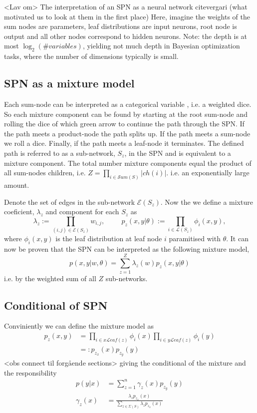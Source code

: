 \begin{note2}
     <Lav om> The interpretation of an SPN as a neural network cite{vergari} (what motivated us to look at them in the first place)
    Here, imagine the weights of the sum nodes are parameters, leaf distributions are input neurons, root node is output and
    all other nodes correspond to hidden neurons.
    Note: the depth is at most $\log_2(\# variables)$, yielding not much depth in Bayesian optimization tasks, where the number
    of dimensions typically is small. 
\end{note2}

\subsection{SPN as a mixture model}
Each sum-node can be interpreted as a categorical variable \cite{??}, i.e. a weighted dice. So each mixture
component can be found by starting at the root sum-node and rolling the dice of which green arrow to
continue the path through the SPN. If the path meets a product-node the path splits up. If the path
meets a sum-node we roll a dice. Finally, if the path meets a leaf-node it terminates. The defined
path is referred to as a sub-network, $S_z$, in the SPN and is equivalent to a mixture component. The total number
mixture components equal the
product of all sum-nodes children, i.e. $Z = \prod_{i\in \mathcal{S}um(S)}|ch(i)|$. 
i.e. an exponentially large amount. 

Denote the set of edges in the sub-network $\mathcal{E}(S_z)$.
Now the we define a mixture coeficient, $\lambda_z$ and component for each $S_z$ as 
$$\lambda_z := \prod_{(i,j)\in \mathcal{E}(S_z)} w_{i,j}, \hspace{1cm} p_z(x,y|\theta) := \prod_{i
\in \mathcal{L}(S_z)} \phi_i(x,y),$$ where $\phi_i(x,y)$ is the leaf distribution at leaf node $i$
paramitised with $\theta$. It can now be proven that the SPN can be interpreted as the following mixture
model, 
$$p(x,y|w,\theta) = \sum_{z=1}^Z \lambda_z(w)p_z(x,y|\theta)$$
i.e. by the weighted sum of all $Z$ sub-networks. 


\subsection{Conditional of SPN}
Conviniently we can define the mixture model as 
\begin{align*}
    p_z(x,y) &= \prod_{i \in x\mathcal{L}eaf(z)} \phi_i(x)\prod_{i \in y\mathcal{L}eaf(z)} \phi_i(y)\\
            &=: p_{z_x}(x) p_{z_y}(y) 
\end{align*}
<obs connect til forgående sections> giving the conditional of the mixture and the responsibility
\begin{align}
    p(y|x) &= \sum_{z=1}^n \gamma_z(x) p_{z_y}(y)\\
    \gamma_z(x) &= \frac{ \lambda_z p_{z_x}(x)}{\sum_{z \in \Sigma(S)} \lambda_z p_{z_x}(x)}
\end{align}

